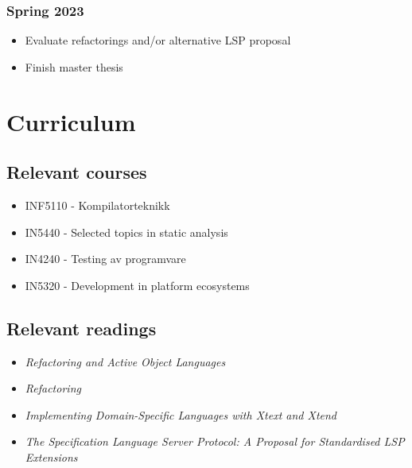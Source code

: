 \documentclass[11pt]{article}
\begin{document}
\subsubsection*{Spring 2023}
\vspace{-0.4cm}
\begin{itemize}
    \itemsep0em
    \item Evaluate refactorings and/or alternative LSP proposal
    \item Finish master thesis
\end{itemize}

\section*{Curriculum}

\subsection*{Relevant courses}
\begin{itemize}
    \item INF5110 - Kompilatorteknikk
    \item IN5440 - Selected topics in static analysis
    \item IN4240 - Testing av programvare
    \item IN5320 - Development in platform ecosystems
\end{itemize}

\subsection*{Relevant readings}

\begin{itemize}
    \item \emph{Refactoring and Active Object Languages}\textsubscript{\cite{DBLP:conf/isola/StolzPG20}}

    \item \emph{Refactoring}\textsubscript{\cite{Fowler1999}}
    \item \emph{Implementing Domain-Specific Languages with Xtext and Xtend}\textsubscript{\cite{lorenzoxtext}}
    \item \emph{The Specification Language Server Protocol: A Proposal for Standardised LSP Extensions}\textsubscript{\cite{DBLP:journals/corr/abs-2108-02961}}

\end{itemize}


\printbibliography
\end{document}
